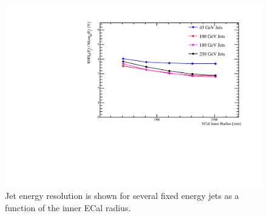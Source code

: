 \begin{figure}
  \includegraphics[width=\largefigwidth]{OptimisationStudies/Plots/JER_vs_ECalInnerRadius.pdf}
  \caption[Jet energy resolution as a function of the ECal inner radius.]{Jet energy resolution is shown for several fixed energy jets as a function of the inner ECal radius.}
  \label{optstud:fig:ecalinnerrad}
\end{figure}

